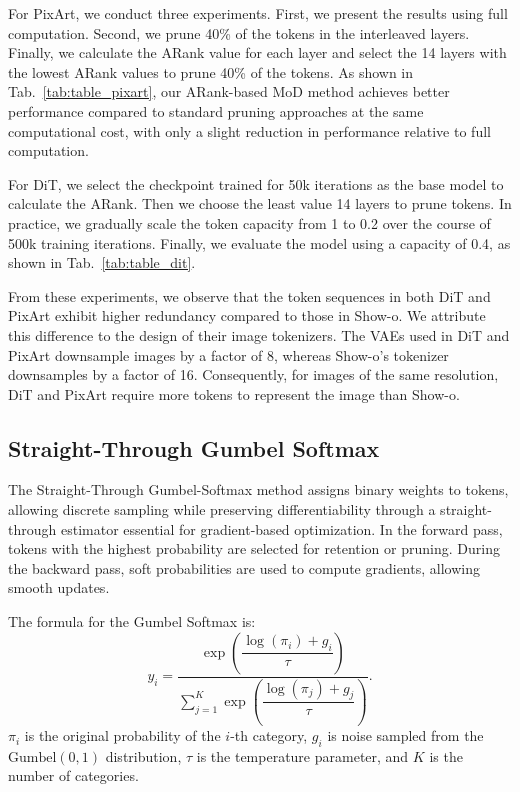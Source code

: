 For PixArt, we conduct three experiments. First, we present the results using full computation. Second, we prune 40\% of the tokens in the interleaved layers. Finally, we calculate the ARank value for each layer and select the 14 layers with the lowest ARank values to prune 40\% of the tokens. As shown in Tab.~\ref{tab:table_pixart}, our ARank-based MoD method achieves better performance compared to standard pruning approaches at the same computational cost, with only a slight reduction in performance relative to full computation.




For DiT, we select the checkpoint trained for 50k iterations as the base model to calculate the ARank. Then we choose the least value  14 layers to prune tokens. In practice, we gradually scale the token capacity from 1 to 0.2 over the course of 500k training iterations. Finally, we evaluate the model using a capacity of 0.4, as shown in Tab.~\ref{tab:table_dit}.

From these experiments, we observe that the token sequences in both DiT and PixArt exhibit higher redundancy compared to those in Show-o. We attribute this difference to the design of their image tokenizers. The VAEs used in DiT and PixArt downsample images by a factor of 8, whereas Show-o's tokenizer downsamples by a factor of 16. Consequently, for images of the same resolution, DiT and PixArt require more tokens to represent the image than Show-o.




\subsection{Straight-Through Gumbel Softmax}
\label{gumbel_softmax_formula}

The Straight-Through Gumbel-Softmax method assigns binary weights to tokens, allowing discrete sampling while preserving differentiability through a straight-through estimator essential for gradient-based optimization. In the forward pass, tokens with the highest probability are selected for retention or pruning. During the backward pass, soft probabilities are used to compute gradients, allowing smooth updates.

The formula for the Gumbel Softmax is:
\begin{equation}
y_i = \frac{\exp\left( \dfrac{\log(\pi_i) + g_i}{\tau} \right)}{\sum\limits_{j=1}^{K} \exp\left( \dfrac{\log(\pi_j) + g_j}{\tau} \right)}.
\end{equation}
$\pi_i$ is the original probability of the $i$-th category, $g_i$ is noise sampled from the $\text{Gumbel}(0,1)$ distribution, $\tau$ is the temperature parameter, and $K$ is the number of categories.

